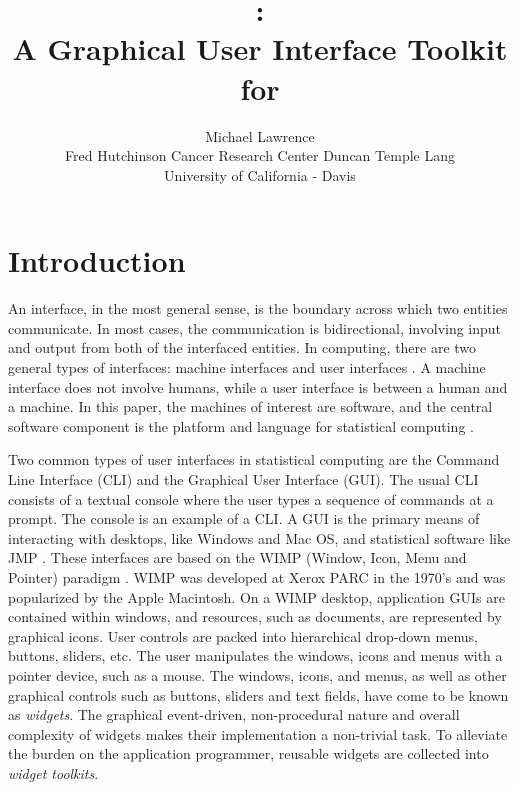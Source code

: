 \documentclass[article,shortnames]{jss}
\author{Michael Lawrence\\
Fred Hutchinson Cancer Research Center \And Duncan Temple Lang\\
University of California - Davis}
\title{\pkg{RGtk2}:\\A Graphical User Interface Toolkit for
\proglang{R}}
\begin{document}
\section{Introduction}


An interface, in the most general sense, is the boundary across which
two
entities communicate. In most cases, the communication is
bidirectional, 
involving input and output from both of the interfaced entities. In
computing,
there are two general types of interfaces: machine interfaces and user
interfaces
\citep{gui-cli}. A machine interface does not involve humans, while a 
user interface is between a human and a machine. In this paper, the
machines of
interest are software, and the central software component is the
platform and language for statistical computing \citep{R}.

Two common types of user interfaces in statistical computing are the
Command Line Interface (CLI) and the Graphical User Interface
(GUI). The usual CLI consists of a textual console where the user
types a sequence of commands at a prompt. The  console is
an example of a CLI. A GUI is the primary means of interacting with
desktops, like Windows and Mac OS, and statistical software like JMP
\citep{JMP}. These interfaces are based on the WIMP (Window, Icon,
Menu and Pointer) paradigm \citep{WIMP}. WIMP was developed at Xerox
PARC in the 1970's and was popularized by the Apple Macintosh. On a
WIMP desktop, application GUIs are contained within windows, and
resources, such as documents, are represented by graphical icons.
User controls are packed into hierarchical drop-down menus, buttons,
sliders, etc. The user manipulates the windows, icons and menus with a
pointer device, such as a mouse.  The windows, icons, and menus, as
well as other graphical controls such as buttons, sliders and text
fields, have come to be known as \emph{widgets}. The graphical
event-driven, non-procedural nature and overall complexity of widgets
makes their implementation a non-trivial task.  To alleviate the
burden on the application programmer, reusable widgets are collected
into \emph{widget toolkits}.
\end{document}
